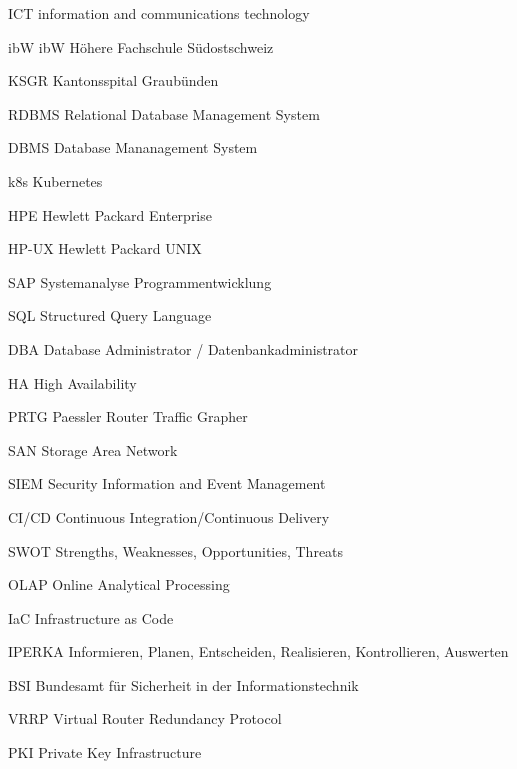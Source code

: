 
\begin{abkuerzungen}[MUSTER] %
    \item[ICT] information and communications technology
    \item[ibW] ibW Höhere Fachschule Südostschweiz
    \item[KSGR] Kantonsspital Graubünden
    \item[\Gls{RDBMS}] Relational Database Management System
    \item[\Gls{DBMS}] Database Mananagement System
    \item[k8s] \Gls{Kubernetes}
    \item[HPE] Hewlett Packard Enterprise
    \item[\Gls{HP-UX}] Hewlett Packard \Gls{UNIX}
    \item[SAP] Systemanalyse Programmentwicklung
    \item[SQL] Structured Query Language
    \item[DBA] Database Administrator / Datenbankadministrator
    \item[HA] High Availability
    \item[\Gls{PRTG}] Paessler Router Traffic Grapher
    \item[\Gls{SAN}] Storage Area Network
    \item[\Gls{SIEM}] Security Information and Event Management
    \item[\Gls{CI/CD}] Continuous Integration/Continuous Delivery
    \item[\Gls{SWOT}] Strengths, Weaknesses, Opportunities, Threats
    \item[\Gls{OLAP}] Online Analytical Processing
    \item[IaC] Infrastructure as Code
    \item[IPERKA] Informieren, Planen, Entscheiden, Realisieren, Kontrollieren, Auswerten
    \item[BSI] Bundesamt für Sicherheit in der Informationstechnik
    \item[\Gls{VRRP}] Virtual Router Redundancy Protocol
    \item[\Gls{PKI}] Private Key Infrastructure
\end{abkuerzungen}